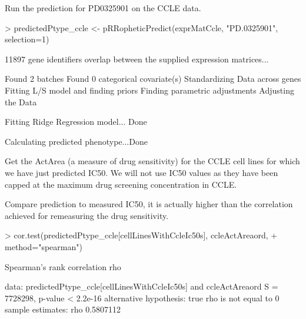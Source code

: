 \documentclass[a4paper]{article}
\begin{document}
Run the prediction for PD0325901 on the CCLE data.
\begin{Schunk}
\begin{Sinput}
> predictedPtype_ccle <- pRRopheticPredict(exprMatCcle, "PD.0325901", selection=1)
\end{Sinput}
\begin{Soutput}
 11897  gene identifiers overlap between the supplied expression matrices... 
 
Found 2 batches
Found 0  categorical covariate(s)
Standardizing Data across genes
Fitting L/S model and finding priors
Finding parametric adjustments
Adjusting the Data

Fitting Ridge Regression model... Done

Calculating predicted phenotype...Done
\end{Soutput}
\end{Schunk}


Get the ActArea (a measure of drug sensitivity) for the CCLE cell lines for which we have just predicted IC50. We will not use IC50 values as they have been capped at the maximum drug screening concentration in CCLE.
\begin{Schunk}
\end{Schunk}

Compare prediction to measured IC50, it is actually higher than the correlation achieved for remeasuring the drug sensitivity.
\begin{Schunk}
\begin{Sinput}
> cor.test(predictedPtype_ccle[cellLinesWithCcleIc50s], ccleActAreaord, 
+ method="spearman")
\end{Sinput}
\begin{Soutput}
	Spearman's rank correlation rho

data:  predictedPtype_ccle[cellLinesWithCcleIc50s] and ccleActAreaord
S = 7728298, p-value < 2.2e-16
alternative hypothesis: true rho is not equal to 0
sample estimates:
      rho 
0.5807112 
\end{Soutput}
\end{Schunk}
\end{document}
